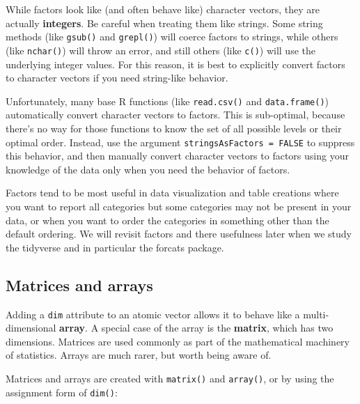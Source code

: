 \documentclass[]{book}
\theoremstyle{definition}
\theoremstyle{definition}
\theoremstyle{definition}
\theoremstyle{remark}
\begin{document}
While factors look like (and often behave like) character vectors, they
are actually \textbf{integers}. Be careful when treating them like
strings. Some string methods (like \texttt{gsub()} and \texttt{grepl()})
will coerce factors to strings, while others (like \texttt{nchar()})
will throw an error, and still others (like \texttt{c()}) will use the
underlying integer values. For this reason, it is best to explicitly
convert factors to character vectors if you need string-like behavior.

Unfortunately, many base R functions (like \texttt{read.csv()} and
\texttt{data.frame()}) automatically convert character vectors to
factors. This is sub-optimal, because there's no way for those functions
to know the set of all possible levels or their optimal order. Instead,
use the argument \texttt{stringsAsFactors\ =\ FALSE} to suppress this
behavior, and then manually convert character vectors to factors using
your knowledge of the data only when you need the behavior of factors.

Factors tend to be most useful in data visualization and table creations
where you want to report all categories but some categories may not be
present in your data, or when you want to order the categories in
something other than the default ordering. We will revisit factors and
there usefulness later when we study the tidyverse and in particular the
forcats package.

\subsection{Matrices and arrays}\label{matrices-and-arrays}

Adding a \texttt{dim} attribute to an atomic vector allows it to behave
like a multi-dimensional \textbf{array}. A special case of the array is
the \textbf{matrix}, which has two dimensions. Matrices are used
commonly as part of the mathematical machinery of statistics. Arrays are
much rarer, but worth being aware of.

Matrices and arrays are created with \texttt{matrix()} and
\texttt{array()}, or by using the assignment form of \texttt{dim()}:
\end{document}
